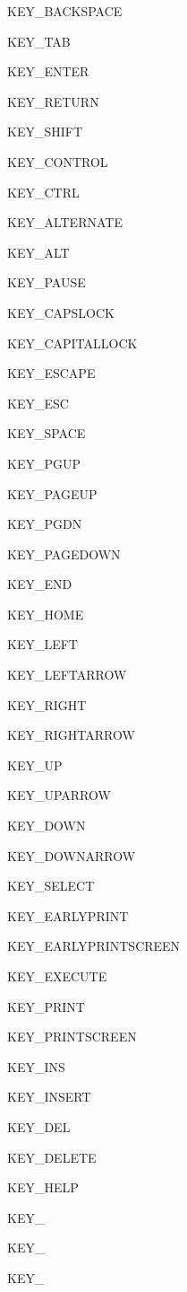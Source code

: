 KEY\_\-BACKSPACE \par
 KEY\_\-TAB \par
 KEY\_\-ENTER \par
 KEY\_\-RETURN \par
 KEY\_\-SHIFT \par
 KEY\_\-CONTROL \par
 KEY\_\-CTRL \par
 KEY\_\-ALTERNATE \par
 KEY\_\-ALT \par
 KEY\_\-PAUSE \par
 KEY\_\-CAPSLOCK \par
 KEY\_\-CAPITALLOCK \par
 KEY\_\-ESCAPE \par
 KEY\_\-ESC \par
 KEY\_\-SPACE \par
 KEY\_\-PGUP \par
 KEY\_\-PAGEUP \par
 KEY\_\-PGDN \par
 KEY\_\-PAGEDOWN \par
 KEY\_\-END \par
 KEY\_\-HOME \par
 KEY\_\-LEFT \par
 KEY\_\-LEFTARROW \par
 KEY\_\-RIGHT \par
 KEY\_\-RIGHTARROW \par
 KEY\_\-UP \par
 KEY\_\-UPARROW \par
 KEY\_\-DOWN \par
 KEY\_\-DOWNARROW \par
 KEY\_\-SELECT \par
 KEY\_\-EARLYPRINT \par
 KEY\_\-EARLYPRINTSCREEN \par
 KEY\_\-EXECUTE \par
 KEY\_\-PRINT \par
 KEY\_\-PRINTSCREEN \par
 KEY\_\-INS \par
 KEY\_\-INSERT \par
 KEY\_\-DEL \par
 KEY\_\-DELETE \par
 KEY\_\-HELP \par
 \par
 KEY\_ \par
 KEY\_ \par
 KEY\_ \par
